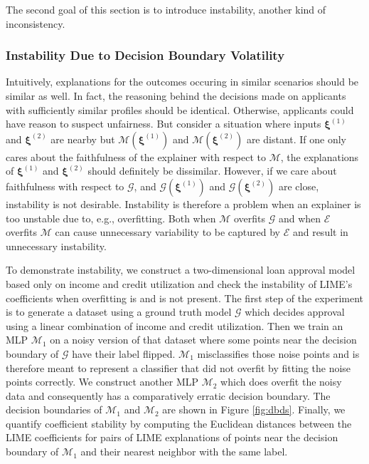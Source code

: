 \documentclass[mnsc,blindrev]{informs3}
\begin{document}
     
     



        
        The second goal of this section is to introduce instability, another kind of inconsistency. 
        
        \subsubsection{Instability Due to Decision Boundary Volatility}         
            \label{sec:instability}
            Intuitively, explanations for the outcomes occuring in similar scenarios should be similar as well. In fact, the reasoning behind the decisions made on applicants with sufficiently similar profiles should be identical. Otherwise, applicants could have reason to suspect unfairness. But consider a situation where inputs $\boldsymbol{\xi}^{(1)}$ and $\boldsymbol{\xi}^{(2)}$ are nearby but $\mathcal{M}(\boldsymbol{\xi}^{(1)})$ and $\mathcal{M}(\boldsymbol{\xi}^{(2)})$ are distant. If one only cares about the faithfulness of the explainer with respect to $\mathcal{M}$, the explanations of $\boldsymbol{\xi}^{(1)}$ and $\boldsymbol{\xi}^{(2)}$ should definitely be dissimilar. However, if we care about faithfulness with respect to $\mathcal{G}$, and $\mathcal{G}(\boldsymbol{\xi}^{(1)})$ and $\mathcal{G}(\boldsymbol{\xi}^{(2)})$ are close, instability is not desirable. Instability is therefore a problem when an explainer is too unstable due to, e.g., overfitting. Both when $\mathcal{M}$ overfits $\mathcal{G}$ and when $\mathcal{E}$ overfits $\mathcal{M}$ can cause unnecessary variability to be captured by $\mathcal{E}$ and result in unnecessary instability. 
          
            To demonstrate instability, we construct a two-dimensional loan approval model based only on income and credit utilization and check the instability of LIME's coefficients when overfitting is and is not present. %
            The first step of the experiment is to generate a dataset using a ground truth model $\mathcal{G}$ which decides approval using a linear combination of income and credit utilization. Then we train an MLP $\mathcal{M}_1$ on a noisy version of that dataset where some points near the decision boundary of $\mathcal{G}$ have their label flipped. $\mathcal{M}_1$ misclassifies those noise points and is therefore meant to represent a classifier that did not overfit by fitting the noise points correctly. We construct another MLP $\mathcal{M}_{2}$ which does overfit the noisy data and consequently has a comparatively erratic decision boundary. The decision boundaries of $\mathcal{M}_1$ and $\mathcal{M}_2$ are shown in Figure \ref{fig:dbds}. Finally, we quantify coefficient stability by computing the Euclidean distances between the LIME coefficients for pairs of LIME explanations of points near the decision boundary of $\mathcal{M}_1$ and their nearest neighbor with the same label. 
\end{document}

